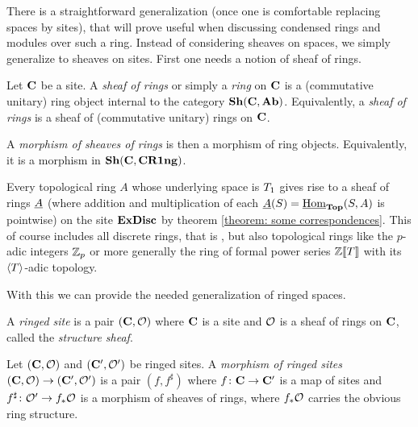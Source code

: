 There is a straightforward generalization (once one is comfortable replacing spaces by sites), that will prove useful when discussing condensed rings and modules over such a ring. Instead of considering sheaves on spaces, we simply generalize to sheaves on sites. First one needs a notion of sheaf of rings.
\begin{definition}
	Let ${{\mathbf{C}}}$ be a site. A \emph{sheaf of rings} or simply a \emph{ring} on ${{\mathbf{C}}}$ is a (commutative unitary) ring object internal to the category $\Sheaves{\site{C}}{\Ab}$. Equivalently, a \emph{sheaf of rings} is a sheaf of (commutative unitary) rings on ${{\mathbf{C}}}$.
	
	A \emph{morphism of sheaves of rings} is then a morphism of ring objects. Equivalently, it is a morphism in $\Sheaves{\site{C}}{\commutativeRings}$.
\end{definition}

\begin{example}
	Every topological ring $A$ whose underlying space is ${T_1}$ gives rise to a sheaf of rings $\underline{A}$ (where addition and multiplication of each $\underline{A}(S)={\underline{\operatorname{Hom}}}_{{\mathbf{Top}}}(S, A)$ is pointwise) on the site ${\mathbf{ExDisc}}$ by theorem \ref{theorem: some correspondences}. This of course includes all discrete rings, that is , but also topological rings like the $p$-adic integers ${\mathbb{Z}}_p$ or more generally the ring of formal power series ${{\mathbb{Z}}[\![T]\!]}$ with its ${\langle T\rangle}$-adic topology.
\end{example}

With this we can provide the needed generalization of ringed spaces.
\begin{definition}
	
	A \emph{ringed site} is a pair $({{\mathbf{C}}}, {\mathcal{O}})$ where ${{\mathbf{C}}}$ is a site and ${\mathcal{O}}$ is a sheaf of rings on ${{\mathbf{C}}}$, called the \emph{structure sheaf}.
	
	Let $({{\mathbf{C}}},{\mathcal{O}})$ and $({{\mathbf{C}}}', {\mathcal{O}}')$ be ringed sites. A \emph{morphism of ringed sites} $({{\mathbf{C}}},{\mathcal{O}}) \to ({{\mathbf{C}}}', {\mathcal{O}}')$ is a pair $(f, f^\sharp)$ where $f\colon {{\mathbf{C}}}\to {{\mathbf{C}}}'$ is a map of sites and $f^\sharp \colon {\mathcal{O}}' \to f_\ast {\mathcal{O}}$ is a morphism of sheaves of rings, where $f_\ast {\mathcal{O}}$ carries the obvious ring structure.
%	
\end{definition}

